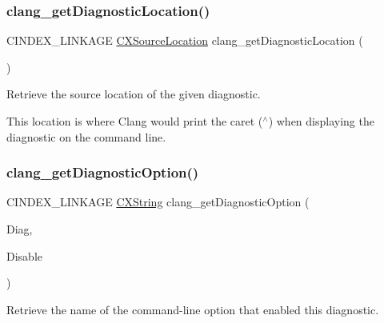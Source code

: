 \subsubsection{\texorpdfstring{clang\+\_\+get\+Diagnostic\+Location()}{clang\_getDiagnosticLocation()}}
{\footnotesize\ttfamily C\+I\+N\+D\+E\+X\+\_\+\+L\+I\+N\+K\+A\+GE \hyperlink{structCXSourceLocation}{C\+X\+Source\+Location} clang\+\_\+get\+Diagnostic\+Location (\begin{DoxyParamCaption}\item[{\hyperlink{group__CINDEX__DIAG_ga44bb8aba7c40590ad25d1763c4fbff7f}{C\+X\+Diagnostic}}]{ }\end{DoxyParamCaption})}



Retrieve the source location of the given diagnostic. 

This location is where Clang would print the caret (\textquotesingle{}$^\wedge$\textquotesingle{}) when displaying the diagnostic on the command line. \mbox{\label{group__CINDEX__DIAG_ga69b094e2cca1cd6f452327dc9204a168}} 
\subsubsection{\texorpdfstring{clang\+\_\+get\+Diagnostic\+Option()}{clang\_getDiagnosticOption()}}
{\footnotesize\ttfamily C\+I\+N\+D\+E\+X\+\_\+\+L\+I\+N\+K\+A\+GE \hyperlink{structCXString}{C\+X\+String} clang\+\_\+get\+Diagnostic\+Option (\begin{DoxyParamCaption}\item[{\hyperlink{group__CINDEX__DIAG_ga44bb8aba7c40590ad25d1763c4fbff7f}{C\+X\+Diagnostic}}]{Diag,  }\item[{\hyperlink{structCXString}{C\+X\+String} $\ast$}]{Disable }\end{DoxyParamCaption})}



Retrieve the name of the command-\/line option that enabled this diagnostic. 


